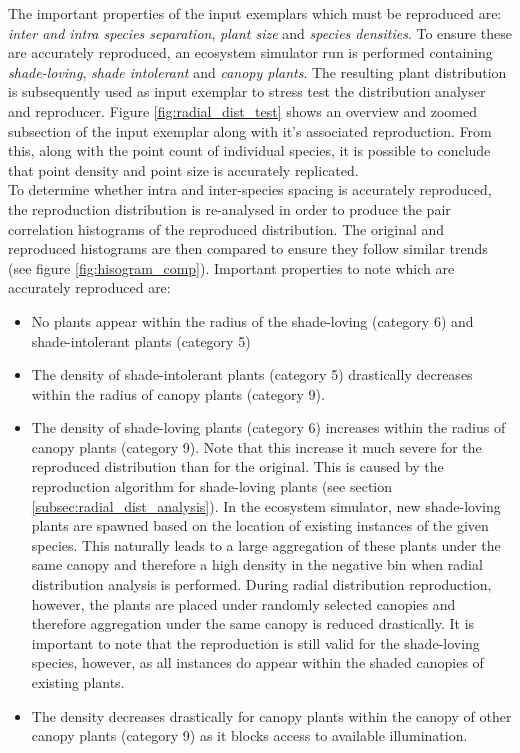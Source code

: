 The important properties of the input exemplars which must be reproduced are: \textit{inter and intra species separation}, \textit{plant size} and \textit{species densities}. To ensure these are accurately reproduced, an ecosystem simulator run is performed containing \textit{shade-loving}, \textit{shade intolerant} and \textit{canopy plants}. The resulting plant distribution is subsequently used as input exemplar to stress test the distribution analyser and reproducer. Figure \ref{fig:radial_dist_test} shows an overview and zoomed subsection of the input exemplar along with it's associated reproduction. From this, along with the point count of individual species, it is possible to conclude that point density and point size is accurately replicated.\\
To determine whether intra and inter-species spacing is accurately reproduced, the reproduction distribution is re-analysed in order to produce the pair correlation histograms of the reproduced distribution. The original and reproduced histograms are then compared to ensure they follow similar trends (see figure \ref{fig:hisogram_comp}). Important properties to note which are accurately reproduced are:
\begin{itemize}
\item No plants appear within the radius of the shade-loving (category 6) and shade-intolerant plants (category 5)
\item The density of shade-intolerant plants (category 5) drastically decreases within the radius of canopy plants (category 9).
\item The density of shade-loving plants (category 6) increases within the radius of canopy plants (category 9). Note that this increase it much severe for the reproduced distribution than for the original. This is caused by the reproduction algorithm for shade-loving plants (see section \ref{subsec:radial_dist_analysis}). In the ecosystem simulator, new shade-loving plants are spawned based on the location of existing instances of the given species. This naturally leads to a large aggregation of these plants under the same canopy and therefore a high density in the negative bin when radial distribution analysis is performed. During radial distribution reproduction, however, the plants are placed under randomly selected canopies and therefore aggregation under the same canopy is reduced drastically. It is important to note that the reproduction is still valid for the shade-loving species, however, as all instances do appear within the shaded canopies of existing plants.
\item The density decreases drastically for canopy plants within the canopy of other canopy plants (category 9) as it blocks access to available illumination.
\end{itemize}

